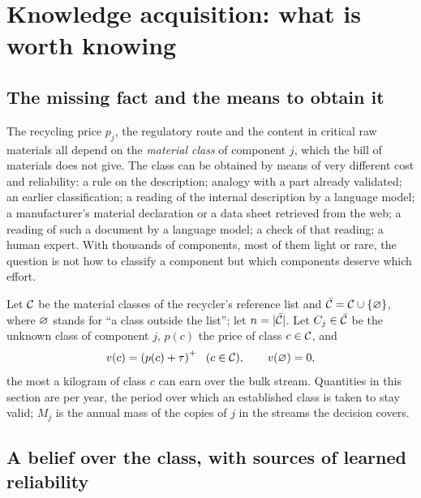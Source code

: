 \section{Knowledge acquisition: what is worth knowing}\label{sec:knowledge}

\subsection{The missing fact and the means to obtain it}

The recycling price $p_j$, the regulatory route and the content in critical raw materials all depend on the
\emph{material class} of component $j$, which the bill of materials does not give. The class can be obtained by
means of very different cost and reliability: a rule on the description; analogy with a part already validated; an
earlier classification; a reading of the internal description by a language model; a manufacturer's material
declaration or a data sheet retrieved from the web; a reading of such a document by a language model; a check of
that reading; a human expert. With thousands of components, most of them light or rare, the question is not how to
classify a component but which components deserve which effort.

Let $\mathcal{C}$ be the material classes of the recycler's reference list and $\bar{\mathcal{C}}=\mathcal{C}\cup\{\varnothing\}$, where $\varnothing$ stands
for ``a class outside the list''; let $n=|\bar{\mathcal{C}}|$. Let $C_j\in\bar{\mathcal{C}}$ be the unknown class of component $j$, $p(c)$ the
price of class $c\in\mathcal{C}$, and
\[
v(c)=\left(p(c)+\tau\right)^{+}\ \ (c\in\mathcal{C}),\qquad v(\varnothing)=0,
\]
the most a kilogram of class $c$ can earn over the bulk stream. Quantities in this section are per year, the period
over which an established class is taken to stay valid; $M_j$ is the annual mass of the copies of $j$ in the streams
the decision covers.

\subsection{A belief over the class, with sources of learned reliability}\label{sec:belief}

